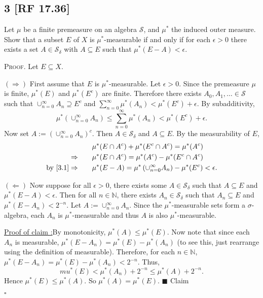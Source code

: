 \documentclass[12pt]{article}
\newcounter{ProofCounter}
\newcounter{ClaimCounter}[ProofCounter]
\newenvironment{Proof}{\stepcounter{ProofCounter}\textsc{Proof.}}{\hfill$\square$}
\newenvironment{claim}[1]{\vspace{1mm}\stepcounter{ClaimCounter}\par\noindent\underline{\bf Claim \theClaimCounter:}\space#1}{}
\newenvironment{claimproof}[1]{\par\noindent\underline{Proof of claim \theClaimCounter:}\space#1}{\hfill $\blacksquare$ Claim \theClaimCounter}
\begin{document}
\subsection*{3 [RF 17.36]}
\begin{tcolorbox}
Let $\mu$ be a finite premeasure on an algebra $\mathcal{S}$, and $\mu^{*}$ the induced outer measure. Show that a subset $E$ of $X$ is
$\mu^*$-measurable if and only if for each $\epsilon > 0$ there exists a set $A \in \mathcal{S}_{\delta}$ with $A\subseteq E$ such that $\mu^*(E-A) <
\epsilon$.
\end{tcolorbox}
\begin{Proof} Let $E \subseteq X$.

$(\Rightarrow)$ First assume that $E$ is $\mu^*$-measurable. Let $\epsilon > 0$. Since the premeasure $\mu$ is finite, $\mu^*(E)$ and $\mu^*(E^{c})$ are finite. Therefore
there exists $A_{0}, A_1, \hdots \in \mathcal{S}$ such that $\cup_{n=0}^{\infty}A_{n} \supseteq E^{c}$ and $\sum_{n=0}^{\infty}\mu^*(A_{n}) <
\mu^{*}(E^c) + \epsilon$. By subadditivity,
\begin{equation}
\mu^{*}\left( \cup_{n=0}^{\infty}A_{n} \right) \leq \sum_{n=0}^{\infty}\mu^*(A_{n}) < \mu^*(E^c) + \epsilon.
\label{3.1}
\end{equation}
Now set $A := \left( \cup_{n=0}^{\infty}A_{n} \right)^{c}$. Then $A \in \mathcal{S}_{\delta}$ and $A\subseteq E$. By the measurability of $E$,
\begin{align*}
& \mu^{*}(E\cap A^{c}) + \mu^{*}(E^{c}\cap A^{c}) = \mu^{*}(A^{c}) \\
\Rightarrow \qquad & \mu^{*}(E\cap A^{c}) = \mu^{*}(A^{c}) - \mu^{*}(E^{c}\cap A^{c}) \\
\text{by } \eqref{3.1} \Rightarrow \qquad & \mu^*(E - A) = \mu^*\left( \cup_{n=0}^{\infty}A_{n} \right) - \mu^{*}(E^{c}) < \epsilon.
\end{align*}

$(\Leftarrow)$ Now suppose for all $\epsilon > 0$, there exists some $A \in \mathcal{S}_{\delta}$ such that $A \subseteq E$ and $\mu^{*}(E - A) <
\epsilon$. Then for all $n \in \mathbb{N}$, there exists $A_{n} \in \mathcal{S}_{\delta}$ such that $A_{n} \subseteq E$ and $\mu^{*}(E - A_{n}) < 2^{-n}$.
Let $A := \cup_{n=0}^{\infty}A_{n}$. Since the $\mu^*$-measurable sets form a $\sigma$-algebra, each $A_{n}$ is $\mu^*$-measurable and thus $A$ is
also $\mu^*$-measurable.
\begin{claimproof}
By monotonicity, $\mu^*(A) \leq \mu^*(E)$.
Now note that since each $A_{n}$ is measurable, $\mu^{*}(E - A_{n}) = \mu^*(E) - \mu^*(A_{n})$ (to see this, just rearrange using the definition of measurable).
Therefore, for each $n \in \mathbb{N}$, $\mu^{*}(E - A_{n}) = \mu^{*}(E) - \mu^{*}(A_{n}) < 2^{-n}$. Thus,
\[ mu^{*}(E) < \mu^{*}(A_{n}) + 2^{-n} \leq \mu^*(A) + 2^{-n}. \]
Hence $\mu^*(E) \leq \mu^*(A)$. So $\mu^{*}(A) = \mu^{*}(E)$.
\end{claimproof}


\end{Proof}
\end{document}
